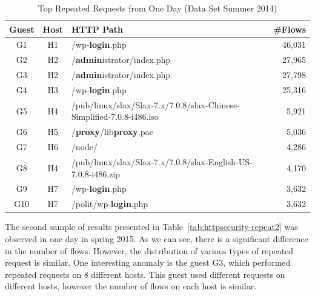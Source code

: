 \begin{table}[ht]
\centering
\begin{tabular}{| c | c | l | r|} \hline
Guest & Host & HTTP Path & \#Flows \\ \hline
G1  & H1 &                 /wp-\textbf{login}.php & 46,031 \\ \hline
G2  & H2 &      /\textbf{admin}istrator/index.php & 27,965 \\ \hline
G3  & H2 &      /\textbf{admin}istrator/index.php & 27,798 \\ \hline
G4  & H3 &                 /wp-\textbf{login}.php & 25,316 \\ \hline
G5  & H4 & \parbox[t]{5cm}{/pub/linux/slax/Slax-7.x/7.0.8/slax-Chinese-Simplified-7.0.8-i486.iso} & 5,921 \\ \hline
G6  & H5 &           /\textbf{proxy}/lib\textbf{proxy}.pac & 5,036 \\ \hline
G7  & H6 &                        /node/ & 4,286 \\ \hline
G8  & H4 & \parbox[t]{5cm}{/pub/linux/slax/Slax-7.x/7.0.8/slax-English-US-7.0.8-i486.zip} & 4,170 \\ \hline
G9  & H7 &                 /wp-\textbf{login}.php & 3,632 \\ \hline
G10 & H7 &           /polit/wp-\textbf{login}.php & 3,632 \\ \hline
\end{tabular}
\caption{Top Repeated Requests from One Day (Data Set Summer 2014)}
\label{tab:httpsecurity-repeat}
\end{table}

The second sample of results presented in Table~\ref{tab:httpsecurity-repeat2} was observed in one day in spring 2015. As we can see, there is a significant difference in the number of flows. However, the distribution of various types of repeated request is similar. One interesting anomaly is the guest G3, which performed repeated requests on 8 different hosts. This guest used different requests on different hosts, however the number of flows on each host is similar.

